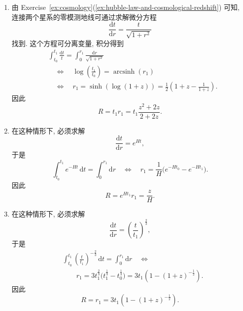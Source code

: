 \begin{description}[font=\normalfont,leftmargin=2em,labelwidth=1.5em]
\begin{enumerate}[label=(\alph*),ref=\alph*,leftmargin=*]
\item 由 Exercise~\ref{ex:cosmology}(\ref{ex:hubble-law-and-cosmological-redshift}) 可知, 连接两个星系的零模测地线可通过求解微分方程
\[
  \frac{\mathrm{d}t}{\mathrm{d}r}=\frac{t}{\sqrt{1+r^2}}
\]
找到. 这个方程可分离变量, 积分得到
\begin{align*}
  &\int_{t_0}^{t_1}\frac{\mathrm{d}t}{t}=\int_0^{r_1}\frac{\mathrm{d}r}{\sqrt{1+r^2}}\\
  &\quad\Longleftrightarrow\quad
    \log\left(\frac{t_1}{t_0}\right)=\operatorname{arcsinh}(r_1)\\
  &\quad\Longleftrightarrow\quad
    r_1=\sinh(\log(1+z))=\frac{1}{2}\left(1+z-\frac{1}{1+z}\right).
\end{align*}
因此
\[
  R=t_1r_1=t_1\frac{z^2+2z}{2+2z}.
\]
\item 在这种情形下, 必须求解
\[
  \frac{\mathrm{d}t}{\mathrm{d}r}=e^{Ht},
\]
于是
\[
  \int_{t_0}^{t_1}e^{-Ht}\,\mathrm{d}t=\int_0^{r_1}\mathrm{d}r
  \quad\Longleftrightarrow\quad
  r_1=\frac{1}{H}\bigl(e^{-Ht_0}-e^{-Ht_1}\bigr).
\]
因此
\[
  R=e^{Ht_1}r_1=\frac{z}{H}.
\]
\item 在这种情形下, 必须求解
\[
  \frac{\mathrm{d}t}{\mathrm{d}r}=\left(\frac{t}{t_1}\right)^{\frac{2}{3}},
\]
于是
\begin{align*}
  &\int_{t_0}^{t_1}\left(\frac{t}{t_1}\right)^{-\frac{2}{3}}\,\mathrm{d}t=\int_0^{r_1}\mathrm{d}r
    \quad\Longleftrightarrow\\
  &\qquad r_1=3t_1^{\frac{2}{3}}\bigl(t_1^{\frac{1}{3}}-t_0^{\frac{1}{3}}\bigr)
     =3t_1\left(1-(1+z)^{-\frac{1}{2}}\right).
\end{align*}
因此
\[
  R=r_1=3t_1\left(1-(1+z)^{-\frac{1}{2}}\right).
\]
\end{enumerate}
\end{description}

